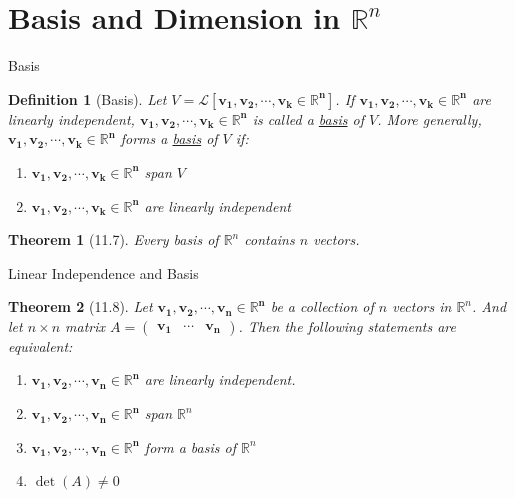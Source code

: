 \documentclass[final]{beamer}
\newtheorem{defn}{Definition}
\newtheorem{thm}{Theorem}
\begin{document}

\section{Basis and Dimension in $\mathbb{R}^n$} %
\label{sec:basis_and_dimension_in_mathbb_r_n}
\begin{frame}[t]{Basis}
	\begin{defn}
		[Basis] Let $V=\mathcal{L}[\mathbf{v_1,v_2,\cdots,v_k\in\mathbb{R}^n}]$. If $\mathbf{v_1,v_2,\cdots,v_k\in\mathbb{R}^n}$ are linearly independent, $\mathbf{v_1,v_2,\cdots,v_k\in\mathbb{R}^n}$ is called a \uline{basis} of $V$. More generally,  $\mathbf{v_1,v_2,\cdots,v_k\in\mathbb{R}^n}$ forms a \uline{basis} of $V$ if:
		\begin{enumerate}
			\item $\mathbf{v_1,v_2,\cdots,v_k\in\mathbb{R}^n}$ span $V$
			\item $\mathbf{v_1,v_2,\cdots,v_k\in\mathbb{R}^n}$ are linearly independent
		\end{enumerate}
	\end{defn}
	\begin{thm}
		[11.7] Every basis of $\mathbb{R}^n$ contains $n$ vectors.
	\end{thm}
\end{frame}

\begin{frame}[t]{Linear Independence and Basis}
	\begin{thm}
		[11.8] Let $\mathbf{v_1,v_2,\cdots,v_n\in\mathbb{R}^n}$ be a collection of $n$ vectors in $\mathbb{R}^n$. And let $n\times n$ matrix $A = \begin{pmatrix}
			\mathbf{v_1}&\cdots&\mathbf{v_n}
		\end{pmatrix}$. Then the following statements are equivalent:
		\begin{enumerate}
			\item $\mathbf{v_1,v_2,\cdots,v_n\in\mathbb{R}^n}$ are linearly independent.
			\item $\mathbf{v_1,v_2,\cdots,v_n\in\mathbb{R}^n}$ span $\mathbb{R}^n$
			\item $\mathbf{v_1,v_2,\cdots,v_n\in\mathbb{R}^n}$ form a basis of $\mathbb{R}^n$
			\item $\det(A)\neq 0$
		\end{enumerate}
	\end{thm}
\end{frame}
\end{document}
